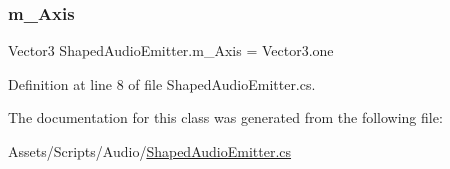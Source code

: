 \subsubsection{\texorpdfstring{m\+\_\+\+Axis}{m\_Axis}}
{\footnotesize\ttfamily Vector3 Shaped\+Audio\+Emitter.\+m\+\_\+\+Axis = Vector3.\+one}



Definition at line 8 of file Shaped\+Audio\+Emitter.\+cs.



The documentation for this class was generated from the following file\+:\begin{DoxyCompactItemize}
\item 
Assets/\+Scripts/\+Audio/\mbox{\hyperlink{_shaped_audio_emitter_8cs}{Shaped\+Audio\+Emitter.\+cs}}\end{DoxyCompactItemize}
